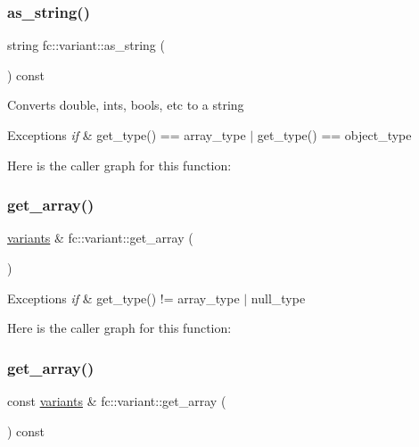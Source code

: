 \subsubsection{\texorpdfstring{as\+\_\+string()}{as\_string()}}
{\footnotesize\ttfamily string fc\+::variant\+::as\+\_\+string (\begin{DoxyParamCaption}{ }\end{DoxyParamCaption}) const}

Convert\textquotesingle{}s double, ints, bools, etc to a string 
\begin{DoxyExceptions}{Exceptions}
{\em if} & get\+\_\+type() == array\+\_\+type $\vert$ get\+\_\+type() == object\+\_\+type \\
\hline
\end{DoxyExceptions}
Here is the caller graph for this function\+:
\mbox{\label{classfc_1_1variant_aea83c87e4e1b1e185f57717b4bd683a5}} 
\subsubsection{\texorpdfstring{get\+\_\+array()}{get\_array()}\hspace{0.1cm}{\footnotesize\ttfamily [1/2]}}
{\footnotesize\ttfamily \mbox{\hyperlink{classstd_1_1vector}{variants}} \& fc\+::variant\+::get\+\_\+array (\begin{DoxyParamCaption}{ }\end{DoxyParamCaption})}


\begin{DoxyExceptions}{Exceptions}
{\em if} & get\+\_\+type() != array\+\_\+type $\vert$ null\+\_\+type \\
\hline
\end{DoxyExceptions}
Here is the caller graph for this function\+:
\mbox{\label{classfc_1_1variant_a5cb44834253397df276f5107cf9211b6}} 
\subsubsection{\texorpdfstring{get\+\_\+array()}{get\_array()}\hspace{0.1cm}{\footnotesize\ttfamily [2/2]}}
{\footnotesize\ttfamily const \mbox{\hyperlink{classstd_1_1vector}{variants}} \& fc\+::variant\+::get\+\_\+array (\begin{DoxyParamCaption}{ }\end{DoxyParamCaption}) const}


